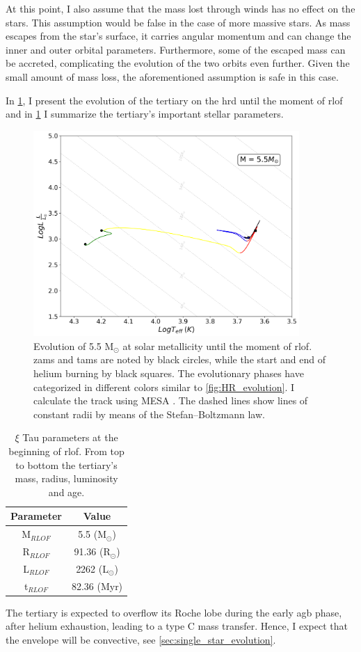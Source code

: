 At this point, I also assume that the mass lost through winds has no effect on the stars. This assumption would be false in the case of more massive stars. As mass escapes from the star's surface, it carries angular momentum and can change the inner and outer orbital parameters. Furthermore, some of the escaped mass can be accreted, complicating the evolution of the two orbits even further. Given the small amount of mass loss, the aforementioned assumption is safe in this case.

In \cref{fig:HR_ROLF}, I present the evolution of the tertiary on the \ac{hrd} until the moment of \ac{rlof} and in \cref{tab:tertiary_param_ROLF} I summarize the tertiary's important stellar parameters. 
\begin{figure}[H]
    \centering
    \includegraphics[width=0.9\textwidth]{Thesis/graphs/HR_1-1ROLF.pdf}
    \caption{Evolution of 5.5 M$_{\odot}$ at solar metallicity until the moment of \ac{rlof}. \ac{zams} and \ac{tams} are noted by black circles, while the start and end of helium burning by black squares. The evolutionary phases have categorized in different colors similar to \cref{fig:HR_evolution}. I calculate the track using MESA \citep{paxton2010modules,paxton2013modules,paxton2015modules,paxton2019modules}. The dashed lines show lines of constant radii by means of the Stefan–Boltzmann law.}
    \label{fig:HR_ROLF}
\end{figure}
\begin{table}[H]
    \centering
    \begin{tabular}{| c | c |}
       Parameter & Value \\
       \hline 
       M$_{RLOF}$ & 5.5 (M$_{\odot}$) \\
       R$_{RLOF}$ & 91.36 (R$_{\odot}$) \\
       L$_{RLOF}$ & 2262 (L$_{\odot}$) \\
       t$_{RLOF}$ & 82.36 (Myr) 
    \end{tabular}
    \caption{ $\xi$ Tau parameters at the beginning of \ac{rlof}. From top to bottom the tertiary's mass, radius, luminosity and age.}
    \label{tab:tertiary_param_ROLF}
\end{table}
The tertiary is expected to overflow its Roche lobe during the early \ac{agb} phase, after helium exhaustion, leading to a type C mass transfer. Hence, I expect that the envelope will be convective, see \cref{sec:single_star_evolution}.

